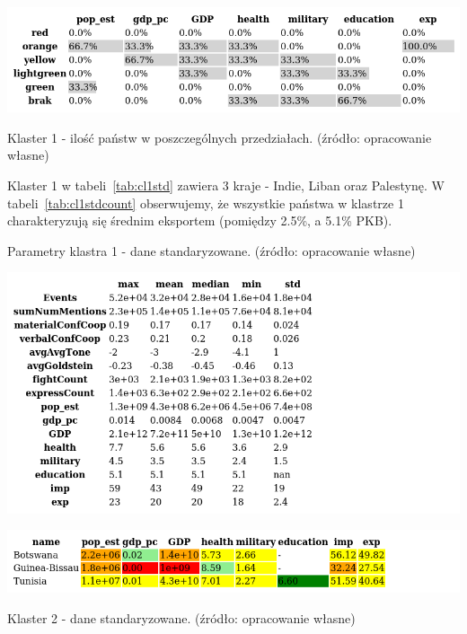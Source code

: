 \documentclass[11pt]{report}
\begin{document}
    \begin{table}[!htp]
        \centering
        \includegraphics[width=\linewidth]{tables/CLUST/cluster1stdkmeanscount.png}
        \caption{Klaster 1 - ilość państw w poszczególnych przedziałach. (źródło: opracowanie własne)}
        \label{tab:cl1stdcount}
    \end{table}

    Klaster 1 w tabeli~\ref{tab:cl1std} zawiera 3 kraje - Indie, Liban oraz Palestynę.
    W tabeli~\ref{tab:cl1stdcount} obserwujemy, że wszystkie państwa w klastrze 1 charakteryzują się średnim eksportem (pomiędzy 2.5\%, a 5.1\% PKB).

    \begin{table}[!htp]
        \centering
        \caption{Parametry klastra 1 - dane standaryzowane. (źródło: opracowanie własne)}
        \label{tab:cl1std_desc}
        \includegraphics[width=\linewidth]{tables/CLUST/desc/clust1std_desc.png}
    \end{table}

    \begin{table}[!htp]
        \centering
        \includegraphics[width=\linewidth]{tables/CLUST/cluster2stdkmeans.png}
        \caption{Klaster 2 - dane standaryzowane. (źródło: opracowanie własne)}
        \label{tab:cl2std}
    \end{table}
\end{document}
